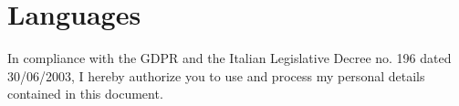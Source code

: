 \section{Languages}
\resumeHeadingListStart{}
\resumeHeadingListEnd{}

\tiny{In compliance with the GDPR and the Italian Legislative Decree no. 196 dated 30/06/2003, I hereby authorize you to use and process my personal details contained in this document.}